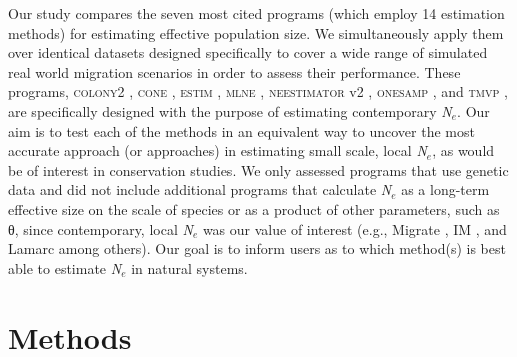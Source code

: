 Our study compares the seven most cited programs (which employ 14 estimation methods) for 
estimating effective population size. We simultaneously apply them over identical datasets 
designed specifically to cover a wide range of simulated real world migration scenarios in 
order to assess their performance. These programs, \textsc{colony2} \citep{Wang:2009}, \textsc{cone} \citep{Anderson:2005}, 
\textsc{estim} \citep{Vitalis:2001c}, \textsc{mlne} \citep{Wang:2003}, 
\textsc{neestimator} v2 \citep{Do:2014}, \textsc{onesamp} \citep{Tallmon:2008}, and 
\textsc{tmvp} \citep{Beaumont:2003}, are specifically designed with the purpose of estimating 
contemporary \emph{N}$_e$. Our aim is to test each of the methods in an equivalent way 
to uncover the most accurate approach (or approaches) in estimating small scale, local 
\emph{N}$_e$, as would be of interest in conservation studies. We only assessed programs 
that use genetic data and did not include additional programs that calculate \emph{N}$_e$ 
as a long-term effective size on the scale of species or as a product of other parameters, 
such as θ, since contemporary, local \emph{N}$_e$ was our value of interest 
(e.g., Migrate \citep{Beerli:2001}, IM \citep{Hey:2004}, and Lamarc \citep{Kuhner:2006} among others). 
Our goal is to inform users as to which method(s) is best able to estimate \emph{N}$_e$ in natural systems.

\section{Methods}
